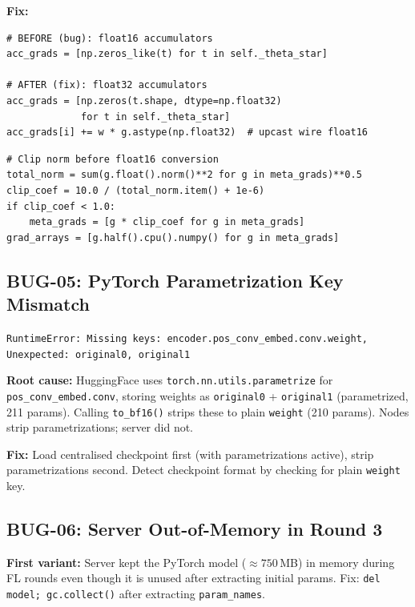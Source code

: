 \documentclass[11pt,a4paper]{article}
\theoremstyle{definition}
\begin{document}
\textbf{Fix:}

\begin{lstlisting}[style=python,caption={BUG-11 fix: float32 accumulators in
\texttt{strategy\_maml.py}}]
# BEFORE (bug): float16 accumulators
acc_grads = [np.zeros_like(t) for t in self._theta_star]

# AFTER (fix): float32 accumulators
acc_grads = [np.zeros(t.shape, dtype=np.float32)
             for t in self._theta_star]
acc_grads[i] += w * g.astype(np.float32)  # upcast wire float16
\end{lstlisting}

\begin{lstlisting}[style=python,caption={BUG-11 fix: client gradient clipping in
\texttt{client\_maml.py}}]
# Clip norm before float16 conversion
total_norm = sum(g.float().norm()**2 for g in meta_grads)**0.5
clip_coef = 10.0 / (total_norm.item() + 1e-6)
if clip_coef < 1.0:
    meta_grads = [g * clip_coef for g in meta_grads]
grad_arrays = [g.half().cpu().numpy() for g in meta_grads]
\end{lstlisting}

\subsection{BUG-05: PyTorch Parametrization Key Mismatch}

\begin{warningbox}[Symptom]
\texttt{RuntimeError: Missing keys: encoder.pos\_conv\_embed.conv.weight,
Unexpected: original0, original1}
\end{warningbox}

\textbf{Root cause:} HuggingFace uses \texttt{torch.nn.utils.parametrize} for
\texttt{pos\_conv\_embed.conv}, storing weights as \texttt{original0} +
\texttt{original1} (parametrized, 211 params).  Calling \texttt{to\_bf16()} strips
these to plain \texttt{weight} (210 params).  Nodes strip parametrizations;
server did not.

\textbf{Fix:} Load centralised checkpoint first (with parametrizations active),
strip parametrizations second.  Detect checkpoint format by checking for plain
\texttt{weight} key.

\subsection{BUG-06: Server Out-of-Memory in Round 3}

\textbf{First variant:} Server kept the PyTorch model ($\approx750$\,MB) in
memory during FL rounds even though it is unused after extracting initial params.
Fix: \texttt{del model; gc.collect()} after extracting \texttt{param\_names}.
\end{document}
